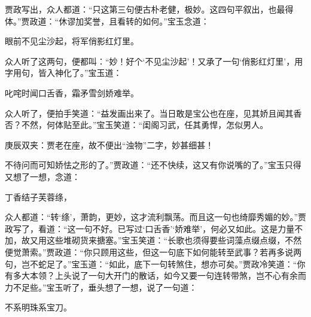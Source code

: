 \begin{parag}
    贾政写出，众人都道：“只这第三句便古朴老健，极妙。这四句平叙出，也最得体。”贾政道：“休谬加奖誉，且看转的如何。”宝玉念道：
\end{parag}


\begin{poem}
    \begin{pl}眼前不见尘沙起，将军俏影红灯里。\end{pl}

\end{poem}


\begin{parag}
    众人听了这两句，便都叫：“妙！好个‘不见尘沙起’！又承了一句‘俏影红灯里’，用字用句，皆入神化了。”宝玉道：
\end{parag}


\begin{poem}
    \begin{pl}叱咤时闻口舌香，霜矛雪剑娇难举。\end{pl}
\end{poem}


\begin{parag}
    众人听了，便拍手笑道：“益发画出来了。当日敢是宝公也在座，见其娇且闻其香否？不然，何体贴至此。”宝玉笑道：“闺阁习武，任其勇悍，怎似男人。\begin{note}庚辰双夹：贾老在座，故不便出“浊物”二字，妙甚细甚！\end{note}不待问而可知娇怯之形的了。”贾政道：“还不快续，这又有你说嘴的了。”宝玉只得又想了一想，念道：
\end{parag}


\begin{poem}
    \begin{pl}丁香结子芙蓉绦，\end{pl}
\end{poem}


\begin{parag}
    众人都道：“转‘绦’，萧韵，更妙，这才流利飘荡。而且这一句也绮靡秀媚的妙。”贾政写了，看道：“这一句不好。已写过‘口舌香’‘娇难举’，何必又如此。这是力量不加，故又用这些堆砌货来搪塞。”宝玉笑道：“长歌也须得要些词藻点缀点缀，不然便觉萧索。”贾政道：“你只顾用这些，但这一句底下如何能转至武事？若再多说两句，岂不蛇足了。”宝玉道：“如此，底下一句转煞住，想亦可矣。”贾政冷笑道：“你有多大本领？上头说了一句大开门的散话，如今又要一句连转带煞，岂不心有余而力不足些。”宝玉听了，垂头想了一想，说了一句道：
\end{parag}


\begin{poem}
    \begin{pl}不系明珠系宝刀。\end{pl}
\end{poem}


